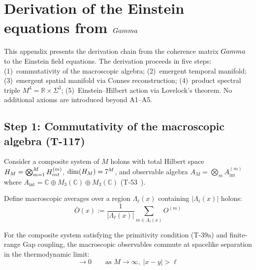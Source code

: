 
\section{Derivation of the Einstein equations from $Gamma$}
\label{app:einstein}

This appendix presents the derivation chain from the coherence matrix $Gamma$ to the
Einstein field equations. The derivation proceeds in five steps: (1)~commutativity of the
macroscopic algebra; (2)~emergent temporal manifold; (3)~emergent spatial manifold via
Connes reconstruction; (4)~product spectral triple $M^4 = \mathbb{R} \times \Sigma^3$;
(5)~Einstein--Hilbert action via Lovelock's theorem. No additional axioms are introduced
beyond A1--A5.

\subsection{Step 1: Commutativity of the macroscopic algebra (T-117)}

Consider a composite system of $M$ holons with total Hilbert space
$H_M = \bigotimes_{m=1}^M H_{int}^{(m)}$, $\dim(H_M) = 7^M$, and
observable algebra $A_M = \bigotimes_m A_{\mathrm{int}}^{(m)}$ where
$A_{\mathrm{int}} = \mathbb{C} \oplus M_3(\mathbb{C}) \oplus M_3(\mathbb{C})$
(T-53~).

Define macroscopic averages over a region $\Lambda_\ell(x)$ containing
$|\Lambda_\ell(x)|$ holons:
\begin{equation}
  \bar{O}(x) := \frac{1}{|\Lambda_\ell(x)|} \sum_{m \in \Lambda_\ell(x)} O^{(m)}
  \label{eq:macro-average}
\end{equation}

\begin{theorembox}
For the composite system satisfying the primitivity condition (T-39a) and finite-range
Gap coupling, the macroscopic observables commute at spacelike separation in the
thermodynamic limit:
\begin{equation}
  [\bar{O}_1(x),\, \bar{O}_2(y)] \to 0
  \qquad\text{as } M \to \infty,\; |x-y| > \ell
  \label{eq:commutativity}
\end{equation}
\end{theorembox}

